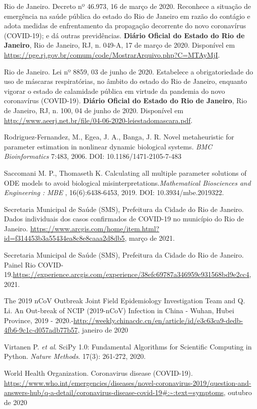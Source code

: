 Rio de Janeiro. Decreto nº 46.973, 16 de março de 2020. Reconhece a situação de emergência na saúde pública do estado do Rio de Janeiro em razão do contágio e adota medidas de enfrentamento da propagação decorrente do novo coronavírus (COVID-19); e dá outras previdências. {\bf Diário Oficial do Estado do Rio de Janeiro}, Rio de Janeiro, RJ, n. 049-A, 17 de março de 2020. Disponível em \url{https://pge.rj.gov.br/comum/code/MostrarArquivo.php?C=MTAyMjI}. 

Rio de Janeiro. Lei nº 8859, 03 de junho de 2020. Estabelece a obrigatoriedade do uso de máscaras respiratórias, no âmbito do estado do Rio de Janeiro, enquanto vigorar o estado de calamidade pública em virtude da pandemia do novo coronavírus (COVID-19). {\bf Diário Oficial do Estado do Rio de Janeiro}, Rio de Janeiro, RJ, n. 100, 04 de junho de 2020. Disponível em \url{http://www.aeerj.net.br/file/04-06-2020-leiestadomascara.pdf}. 

Rodriguez-Fernandez, M., Egea, J. A., Banga, J. R. Novel metaheuristic for parameter estimation in nonlinear dynamic biological systems. {\it BMC Bioinformatics} 7:483, 2006. DOI: 10.1186/1471-2105-7-483

Saccomani M. P., Thomaseth K. Calculating all multiple parameter solutions of
ODE models to avoid biological misinterpretations.{\it Mathematical
Biosciences and Engineering : MBE }, 16(6):6438-6453, 2019. DOI:
10.3934/mbe.2019322.

Secretaria Municipal de Saúde (SMS), Prefeitura da Cidade do Rio de Janeiro. Dados individuais dos casos confirmados de COVID-19 no município do Rio de Janeiro. \url{https://www.arcgis.com/home/item.html?id=f314453b3a55434ea8c8e8caaa2d8db5}, março de 2021.

Secretaria Municipal de Saúde (SMS), Prefeitura da Cidade do Rio de Janeiro. Painel Rio COVID-19.\url{https://experience.arcgis.com/experience/38efc69787a346959c931568bd9e2cc4}, 2021.

The 2019 nCoV Outbreak Joint Field Epidemiology Investigation Team and Q. Li.
An Out-break of NCIP (2019-nCoV) Infection in China - Wuhan, Hubei Province,
2019 -
2020.-\url{http://weekly.chinacdc.cn/en/article/id/e3c63ca9-dedb-4fb6-9c1c-d057adb77b57},
janeiro de 2020

Virtanen P. {\it et al}. SciPy 1.0: Fundamental Algorithms for Scientific Computing
in Python. {\it Nature Methods}. 17(3): 261-272, 2020. 

World Health Organization. Coronavirus disease (COVID-19).
\url{https://www.who.int/emergencies/diseases/novel-coronavirus-2019/question-and-answers-hub/q-a-detail/coronavirus-disease-covid-19#:~:text=symptoms},
outubro de 2020